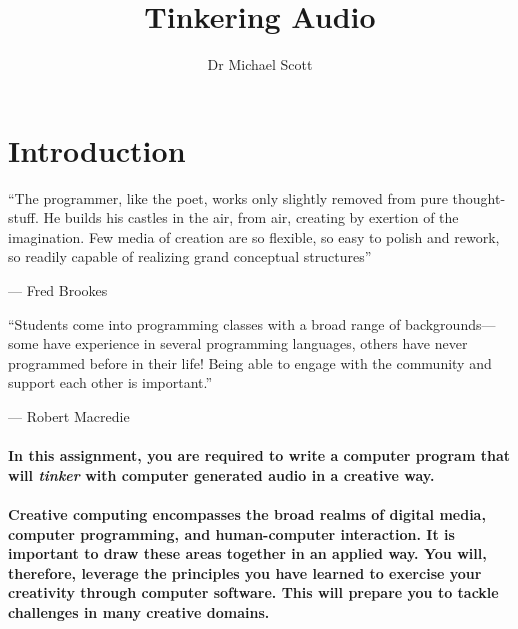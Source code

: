\documentclass{../../fal_assignment}
\title{Tinkering Audio}
\author{Dr Michael Scott}
\begin{document}
\maketitle

\vspace{-1em}

\section*{Introduction}

\begin{marginquote}
``The programmer, like the poet, works only slightly removed from pure thought-stuff. He builds his castles in the air, from air, creating by exertion of the imagination. Few media of creation are so flexible, so easy to polish and rework, so readily capable of realizing grand conceptual structures''

--- Fred Brookes

\marginquoterule

``Students come into programming classes with a broad range of backgrounds---some have experience in several programming languages, others have never programmed before in their life! Being able to engage with the community and support each other is important.''

--- Robert Macredie 
\end{marginquote}

\paragraph{In this assignment, you are required to write a computer program that will \textit{tinker} with computer generated audio in a creative way.}

\paragraph{Creative computing encompasses the broad realms of digital media, computer programming, and human-computer interaction. It is important to draw these areas together in an applied way. You will, therefore, leverage the principles you have learned to exercise your creativity through computer software. This will prepare you to tackle challenges in many creative domains.}
\end{document}
